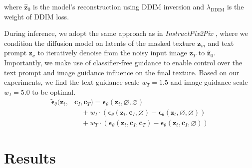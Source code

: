 \documentclass[11pt,twocolumn]{article}
\begin{document}
where $\hat{\mathbf{z}}_0$ is the model's reconstruction using DDIM inversion \cite{ddim} and $\lambda_{\text{DDIM}}$ is the weight of DDIM loss.

During inference, we adopt the same approach as in \textit{InstructPix2Pix} \cite{instructpix2pix}, 
where we condition the diffusion model on latents of the masked texture $\mathbf{z}_m$ and text prompt 
$\mathbf{z_c}$ to iteratively denoise from the noisy input image $\mathbf{z}_T$ to $\hat{\mathbf{z}}_0$. 
Importantly, we make use of classifier-free guidance \cite{cfg} to enable control over the text prompt and 
image guidance influence on the final texture. Based on our experiments, we find the text guidance scale $w_T = 1.5$ 
and image guidance scale $w_I = 5.0$ to be optimal.
\vspace{0.0em}
\begin{align*}
  \tilde{\boldsymbol{\epsilon}}_{\theta}(\mathbf{z}_t, &\mathbf{c}_I, \mathbf{c}_T) = \boldsymbol{\epsilon}_{\theta}(\mathbf{z}_t, \varnothing, \varnothing) \\
  &\quad + w_I \cdot \left( \boldsymbol{\epsilon}_{\theta}(\mathbf{z}_t, \mathbf{c}_I, \varnothing) - \boldsymbol{\epsilon}_{\theta}(\mathbf{z}_t, \varnothing, \varnothing) \right) \\
  &\quad + w_T \cdot \left( \boldsymbol{\epsilon}_{\theta}(\mathbf{z}_t, \mathbf{c}_I, \mathbf{c}_T) - \boldsymbol{\epsilon}_{\theta}(\mathbf{z}_t, \mathbf{c}_I, \varnothing) \right)
\end{align*}




\section{Results}
\end{document}
